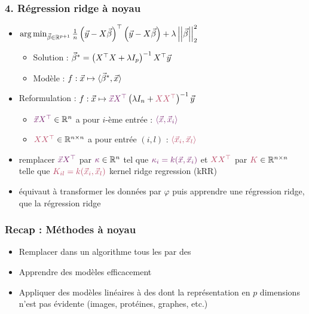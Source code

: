 \begin{frame}
  \frametitle{4. Régression ridge à noyau}
  \begin{itemize}
  \item {}
    \setlength{\itemsep}{3pt}
    {\footnotesize $\operatorname*{arg\,min}_{\vec{\beta} \in {\mathbb R}^{p+1}} \frac1n \left(\vec{y} - X \vec{\beta} \right)^\top
      \left(\vec{y} - X \vec{\beta} \right) + \lambda \left|\left|\vec{\beta}\right|\right|_2^2 $}      
    \begin{itemize}
    \item Solution : $\vec{\beta}^* = \left(X^\top X + \lambda I_p \right)^{-1} X^\top \vec{y}$
    \item Modèle : $f: \vec{x} \mapsto \langle \vec{\beta}^*, \vec{x} \rangle$
    \end{itemize}
  \item Reformulation :
    $f: \xvec \mapsto \textcolor{Aubergine}{\xvec X^\top} \left( \lambda I_n +
      \textcolor{MyPink}{XX^\top} \right)^{-1} \yvec $ 
    \pause
    \begin{itemize}
      \setlength{\itemsep}{3pt}
    \item $\textcolor{Aubergine}{\xvec X^\top} \in \RR^n$ a pour $i$-ème entrée :
      $\textcolor{Aubergine}{\langle \xvec, \xvec_i \rangle}$    
    \item $\textcolor{MyPink}{X X^\top} \in \RR^{n \times n}$ a pour entrée $(i,l)$ :
      $\textcolor{MyPink}{\langle \xvec_i, \xvec_l \rangle}$
    \end{itemize}
    \pause
  \item {} remplacer $\textcolor{Aubergine}{\xvec X^\top}$ par
    $\textcolor{Aubergine}{\kappa} \in \RR^n$ tel que
    $\textcolor{Aubergine}{\kappa_i = k(\xvec, \xvec_i)}$ et $\textcolor{MyPink}{XX^\top}$ par
    $\textcolor{MyPink}{K} \in \RR^{n \times n}$ telle que $\textcolor{MyPink}{K_{il} = k(\xvec_i, \xvec_l)}$
     \hfill \textcolor{gray!70}{kernel ridge regression (kRR)}
   \item[] équivaut à transformer les données par $\varphi$ puis apprendre une régression ridge,  que la régression ridge
  \end{itemize}
\end{frame}


\begin{frame}
  \frametitle{Recap : Méthodes à noyau}
  \begin{itemize}
  \item {} Remplacer dans un algorithme tous les  par des 
  \item Apprendre des modèles  efficacement
  \item Appliquer des modèles linéaires à des  dont la représentation en $p$ dimensions n'est pas évidente (images, protéines, graphes, etc.)
  \end{itemize}
\end{frame}

